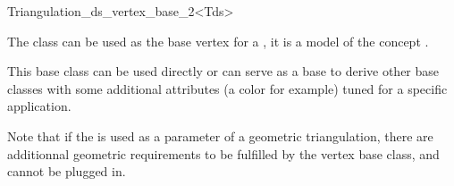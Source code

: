 

\begin{ccRefClass}{Triangulation_ds_vertex_base_2<Tds>}  %


\ccDefinition

The class  can be used as the base vertex
for a , it is a model of the concept
.

This base class can be used directly or can serve as a base to derive
other base classes with some additional attributes (a color for
example) tuned for a specific application.

Note that if the  
is used as a parameter of a
geometric triangulation, there are additionnal geometric requirements
to be fulfilled by the vertex base class,
and  cannot be plugged in.



\ccIsModel


\ccSeeAlso

\\
  

\end{ccRefClass}


